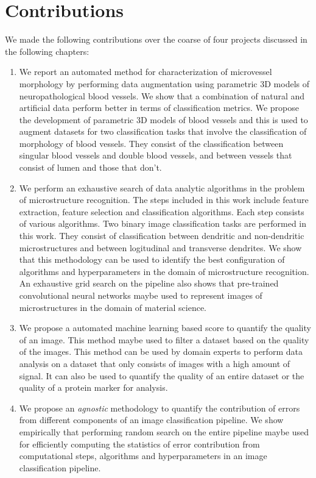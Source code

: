 \section{Contributions}
We made the following contributions over the coarse of four projects discussed in the following chapters:
\begin{enumerate}

\item We report an automated method for characterization of microvessel morphology by performing data augmentation using parametric 3D models of neuropathological blood vessels. We show that a combination of natural and artificial data perform better in terms of classification metrics.  We propose the development of parametric 3D models of blood vessels and this is used to augment datasets for two classification tasks that involve the classification of morphology of blood vessels. They consist of the classification between singular blood vessels and double blood vessels, and between vessels that consist of lumen and those that don't.

\item We perform an exhaustive search of data analytic algorithms in the problem of microstructure recognition. The steps included in this work include feature extraction, feature selection and classification algorithms. Each step consists of various algorithms. Two binary image classification tasks are performed in this work. They consist of classification between dendritic and non-dendritic microstructures and between logitudinal and transverse dendrites. We show that this methodology can be used to identify the best configuration of algorithms and hyperparameters in the domain of microstructure recognition.
An exhaustive grid search on the pipeline also shows that pre-trained convolutional neural networks maybe used to represent images of microstructures in the domain of material science.

\item We propose a  automated machine learning based score to quantify the quality of an image. This method maybe used to filter a dataset based on the quality of the images. This method can be used by domain experts to perform data analysis on a dataset that only consists of images with a high amount of signal. It can also be used to quantify the quality of an entire dataset or the quality of a protein marker for analysis.

\item We propose an \textit{agnostic} methodology to quantify the contribution of errors from different components of an image classification pipeline. 
We show empirically that performing random search on the entire pipeline maybe used for efficiently computing the statistics of error contribution from computational steps, algorithms and hyperparameters in an image classification pipeline.

\end{enumerate}


